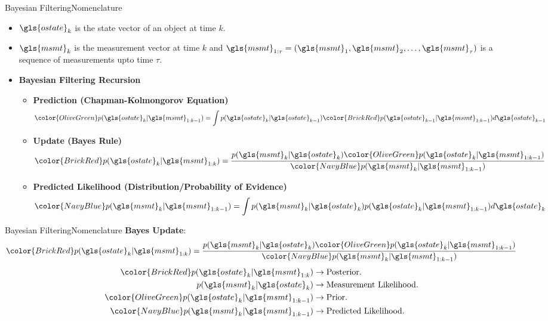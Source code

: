 \documentclass{beamer}
\begin{document}
\begin{frame}{Bayesian Filtering}{Nomenclature}
	\begin{itemize}
		\item $\gls{ostate}_k$ is the state vector of an object at time $k$.
		\item $\gls{msmt}_k$ is the measurement vector at time $k$ and $\gls{msmt}_{1:\tau}=(\gls{msmt}_1, \gls{msmt}_2, \dots, \gls{msmt}_\tau)$ is a sequence of measurements upto time $\tau$.
		\item \textbf{Bayesian Filtering Recursion}
		\begin{itemize}
			\item \textbf{Prediction (Chapman-Kolmongorov Equation)}
			\begin{equation}
				\label{eq:prior}
				{\color{OliveGreen}p(\gls{ostate}_k|\gls{msmt}_{1:k-1})} = \displaystyle\int p(\gls{ostate}_k|\gls{ostate}_{k-1}){\color{BrickRed}p(\gls{ostate}_{k-1}|\gls{msmt}_{1:k-1})} d\gls{ostate}_{k-1}
			\end{equation}
			\item \textbf{Update (Bayes Rule)}
			\begin{equation}
				\label{eq:posterior}
				{\color{BrickRed}p(\gls{ostate}_k|\gls{msmt}_{1:k})} = 
				\dfrac{p(\gls{msmt}_k|\gls{ostate}_k){\color{OliveGreen}p(\gls{ostate}_k|\gls{msmt}_{1:k-1})}}{\color{NavyBlue}p(\gls{msmt}_k|\gls{msmt}_{1:k-1})}
			\end{equation}
			\item \textbf{Predicted Likelihood (Distribution/Probability of Evidence)}
			\begin{equation}
				{\color{NavyBlue}p(\gls{msmt}_k|\gls{msmt}_{1:k-1})} = \displaystyle\int p(\gls{msmt}_k|\gls{ostate}_k)p(\gls{ostate}_k|\gls{msmt}_{1:k-1}) d\gls{ostate}_k
			\end{equation}
		\end{itemize}
	\end{itemize}
\end{frame}
\begin{frame}{Bayesian Filtering}{Nomenclature}
	\textbf{Bayes Update}:
	\begin{equation}
		\label{eq:posterior}
		{\color{BrickRed}p(\gls{ostate}_k|\gls{msmt}_{1:k})} = 
		\dfrac{p(\gls{msmt}_k|\gls{ostate}_k){\color{OliveGreen}p(\gls{ostate}_k|\gls{msmt}_{1:k-1})}}{\color{NavyBlue}p(\gls{msmt}_k|\gls{msmt}_{1:k-1})}\nonumber
	\end{equation}
	\begin{align}
		{\color{BrickRed}p(\gls{ostate}_k|\gls{msmt}_{1:k})} &\to \text{Posterior.}\nonumber\\
		p(\gls{msmt}_k|\gls{ostate}_k) &\to \text{Measurement Likelihood.}\nonumber\\
		{\color{OliveGreen}p(\gls{ostate}_k|\gls{msmt}_{1:k-1})} &\to \text{Prior.}\nonumber\\
		{\color{NavyBlue}p(\gls{msmt}_k|\gls{msmt}_{1:k-1})} &\to \text{Predicted Likelihood.}\nonumber
	\end{align}
\end{frame}
\end{document}
